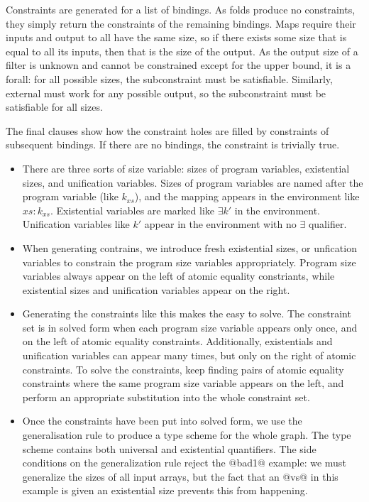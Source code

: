 Constraints are generated for a list of bindings.
As folds produce no constraints, they simply return the constraints of the remaining bindings.
Maps require their inputs and output to all have the same size, so if there exists some size that is equal to all its inputs, then that is the size of the output.
As the output size of a filter is unknown and cannot be constrained except for the upper bound, it is a forall: for all possible sizes, the subconstraint must be satisfiable.
Similarly, external must work for any possible output, so the subconstraint must be satisfiable for all sizes.

The final clauses show how the constraint holes are filled by constraints of subsequent bindings. If there are no bindings, the constraint is trivially true.

\begin{figure*}

\end{figure*}

\begin{itemize}

\item   There are three sorts of size variable: sizes of program variables, existential sizes, and unification variables. Sizes of program variables are named after the program variable (like $k_{xs}$), and the mapping appears in the environment like $xs : k_{xs}$. Existential variables are marked like $\exists k'$ in the environment. Unification variables like $k'$ appear in the environment with no $\exists$ qualifier. 

\item   When generating contrains, we introduce fresh existential sizes, or unfication variables to constrain the program size variables appropriately. Program size variables always appear on the left of atomic equality constriants, while existential sizes and unification variables appear on the right. 

\item   Generating the constraints like this makes the easy to solve. The constraint set is in solved form when each program size variable appears only once, and on the left of atomic equality constraints. Additionally, existentials and unification variables can appear many times, but only on the right of atomic constraints. To solve the constraints, keep finding pairs of atomic equality constraints where the same program size variable appears on the left, and perform an appropriate substitution into the whole constraint set. 

\item   Once the constraints have been put into solved form, we use the generalisation rule to produce a type scheme for the whole graph. The type scheme contains both universal and existential quantifiers. The side conditions on the generalization rule reject the @bad1@ example: we must generalize the sizes of all input arrays, but the fact that an @vs@ in this example is given an existential size prevents this from happening.
\end{itemize}


